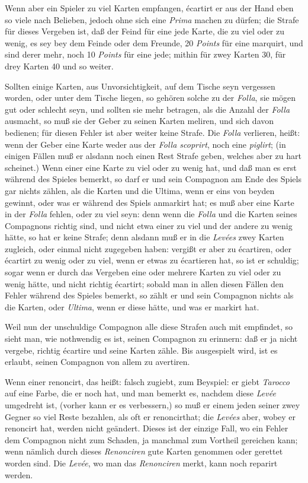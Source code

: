 \documentclass[11pt,a6paper,twoside]{article}
\begin{document}
Wenn aber ein Spieler zu viel Karten empfangen, écartirt er aus der Hand eben so viele nach Belieben, jedoch ohne sich eine \textit{Prima} machen zu dürfen; die Strafe für dieses Vergeben ist, daß der Feind für eine jede Karte, die zu viel oder zu wenig, es sey bey dem Feinde oder dem Freunde, 20 \textit{Points} für eine marquirt, und sind derer mehr, noch 10 \textit{Points} für eine jede; mithin für zwey Karten 30, für drey Karten 40 und so weiter.

Sollten einige Karten, aus Unvorsichtigkeit, auf dem Tische seyn vergessen worden, oder unter dem Tische liegen, so gehören solche zu der \textit{Folla}, sie mögen gut oder schlecht seyn, und sollten sie mehr betragen, als die Anzahl der \textit{Folla} ausmacht, so muß sie der Geber zu seinen Karten meliren, und sich davon bedienen; für diesen Fehler ist aber weiter keine Strafe. Die \textit{Folla} verlieren, heißt: wenn der Geber eine Karte weder aus der \textit{Folla scoprirt}, noch eine \textit{piglirt}; (in einigen Fällen muß er alsdann noch einen Rest Strafe geben, welches aber zu hart scheinet.) Wenn einer eine Karte zu viel oder zu wenig hat, und daß man es erst während des Spieles bemerkt, so darf er und sein Compagnon am Ende des Spiels gar nichts zählen, als die Karten und die Ultima, wenn er eins von beyden gewinnt, oder was er während des Spiels anmarkirt hat; es muß aber eine Karte in der \textit{Folla} fehlen, oder zu viel seyn: denn wenn die \textit{Folla} und die Karten seines Compagnons richtig sind, und nicht etwa einer zu viel und der andere zu wenig hätte, so hat er keine Strafe; denn alsdann muß er in die \textit{Levées} zwey Karten zugleich, oder einmal nicht zugegeben haben: vergißt er aber zu écartiren, oder écartirt zu wenig oder zu viel, wenn er etwas zu écartieren hat, so ist er schuldig; sogar wenn er durch das Vergeben eine oder mehrere Karten zu viel oder zu wenig hätte, und nicht richtig écartirt; sobald man in allen diesen Fällen den Fehler während des Spieles bemerkt, so zählt er und sein Compagnon nichts als die Karten, oder \textit{Ultima}, wenn er diese hätte, und was er markirt hat.

Weil nun der unschuldige Compagnon alle diese Strafen auch mit empfindet, so sieht man, wie nothwendig es ist, seinen Compagnon zu erinnern: daß er ja nicht vergebe, richtig écartire und seine Karten zähle. Bis ausgespielt wird, ist es erlaubt, seinen Compagnon von allem zu avertiren.

Wenn einer renoncirt, das heißt: falsch zugiebt, zum Beyspiel: er giebt \textit{Tarocco} auf eine Farbe, die er noch hat, und man bemerkt es, nachdem diese \textit{Levée} umgedreht ist, (vorher kann er es verbessern,) so muß er einem jeden seiner zwey Gegner so viel Reste bezahlen, als oft er renoncirthat; die \textit{Levées} aber, wobey er renoncirt hat, werden nicht geändert. Dieses ist der einzige Fall, wo ein Fehler dem Compagnon nicht zum Schaden, ja manchmal zum Vortheil gereichen kann; wenn nämlich durch dieses \textit{Renonciren} gute Karten genommen oder gerettet worden sind. Die \textit{Levée}, wo man das \textit{Renonciren} merkt, kann noch reparirt werden.
\end{document}
